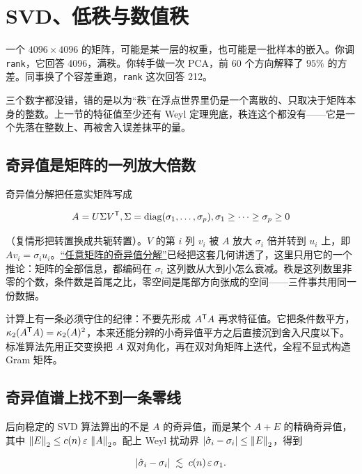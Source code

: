 \section{SVD、低秩与数值秩}
\label{sec:08-Numerical-Analysis/05-Numerical-Linear-Algebra/06}

一个 \(4096\times4096\) 的矩阵，可能是某一层的权重，也可能是一批样本的嵌入。你调 \texttt{rank}，它回答 4096，满秩。你转手做一次 PCA，前 60 个方向解释了 \(95\%\) 的方差。同事换了个容差重跑，\texttt{rank} 这次回答 212。

三个数字都没错，错的是以为``秩''在浮点世界里仍是一个离散的、只取决于矩阵本身的整数。上一节的特征值至少还有 Weyl 定理兜底，秩连这个都没有——它是一个先落在整数上、再被舍入误差抹平的量。

\subsection{奇异值是矩阵的一列放大倍数}

奇异值分解把任意实矩阵写成

\[
A=U\Sigma V^{\mathsf{T}},\space
\Sigma=\operatorname{diag}(\sigma_1,\ldots,\sigma_p),\space
\sigma_1\ge\cdots\ge\sigma_p\ge0
\]

（复情形把转置换成共轭转置）。\(V\) 的第 \(i\) 列 \(v_i\) 被 \(A\) 放大 \(\sigma_i\) 倍并转到 \(u_i\) 上，即 \(Av_i=\sigma_iu_i\)。\hyperref[sec:03-Linear-Algebra/07-SVD-and-Data-Applications/01]{``任意矩阵的奇异值分解''}已经把这套几何讲透了，这里只用它的一个推论：矩阵的全部信息，都编码在 \(\sigma_i\) 这列数从大到小怎么衰减。秩是这列数里非零的个数，条件数是首尾之比，零空间是尾部方向张成的空间——三件事共用同一份数据。

计算上有一条必须守住的纪律：不要先形成 \(A^{\mathsf{T}}A\) 再求特征值。它把条件数平方，\(\kappa_2(A^{\mathsf{T}}A)=\kappa_2(A)^2\)，本来还能分辨的小奇异值平方之后直接沉到舍入尺度以下。标准算法先用正交变换把 \(A\) 双对角化，再在双对角矩阵上迭代，全程不显式构造 Gram 矩阵。

\subsection{奇异值谱上找不到一条零线}

后向稳定的 SVD 算法算出的不是 \(A\) 的奇异值，而是某个 \(A+E\) 的精确奇异值，其中 \(\left\lVert E\right\rVert_2\le c(n)\,\varepsilon\,\left\lVert A\right\rVert_2\)。配上 Weyl 扰动界 \(\left|\hat\sigma_i-\sigma_i\right|\le\left\lVert E\right\rVert_2\)，得到

\[
\left|\hat\sigma_i-\sigma_i\right|\;\lesssim\;c(n)\,\varepsilon\,\sigma_1 .
\]

